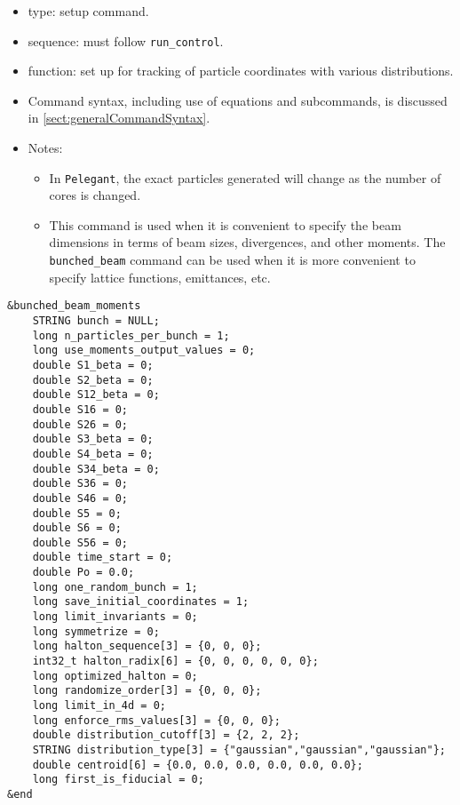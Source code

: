 \documentclass[11pt]{article}
\begin{document}
\begin{itemize}
\item type: setup command.
\item sequence: must follow \verb|run_control|.
\item function: set up for tracking of particle coordinates with various distributions.
\item Command syntax, including use of equations and subcommands, is discussed in \ref{sect:generalCommandSyntax}.
\item Notes:
  \begin{itemize}
  \item In \verb|Pelegant|, the exact particles generated will change as the number of cores is changed.
  \item This command is used when it is convenient to specify the beam dimensions in terms of beam sizes, divergences,
    and other moments. 
    The \verb|bunched_beam| command can be used when it is more convenient to specify lattice functions, emittances, etc.
  \end{itemize}
\end{itemize}

\begin{verbatim}
&bunched_beam_moments
    STRING bunch = NULL;
    long n_particles_per_bunch = 1;
    long use_moments_output_values = 0;
    double S1_beta = 0;
    double S2_beta = 0;
    double S12_beta = 0;
    double S16 = 0;
    double S26 = 0;
    double S3_beta = 0;
    double S4_beta = 0;
    double S34_beta = 0;
    double S36 = 0;
    double S46 = 0;
    double S5 = 0;
    double S6 = 0;
    double S56 = 0;
    double time_start = 0;
    double Po = 0.0;
    long one_random_bunch = 1;
    long save_initial_coordinates = 1;
    long limit_invariants = 0;
    long symmetrize = 0;
    long halton_sequence[3] = {0, 0, 0};
    int32_t halton_radix[6] = {0, 0, 0, 0, 0, 0};
    long optimized_halton = 0;
    long randomize_order[3] = {0, 0, 0};
    long limit_in_4d = 0;
    long enforce_rms_values[3] = {0, 0, 0};
    double distribution_cutoff[3] = {2, 2, 2};
    STRING distribution_type[3] = {"gaussian","gaussian","gaussian"};
    double centroid[6] = {0.0, 0.0, 0.0, 0.0, 0.0, 0.0};
    long first_is_fiducial = 0;
&end
\end{verbatim}
\end{document}
